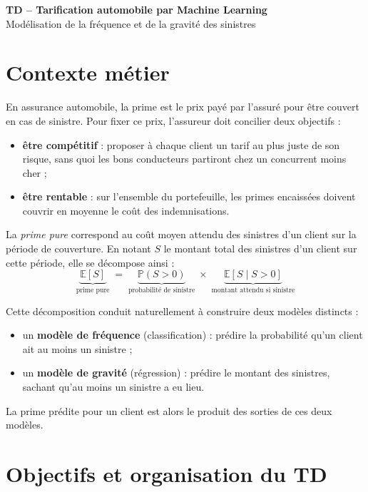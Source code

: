 \documentclass[a4paper,11pt]{article}
\begin{document}
	
	\begin{center}
		{\LARGE\bfseries TD -- Tarification automobile par Machine Learning}\\[6pt]
		{\large Modélisation de la fréquence et de la gravité des sinistres}
	\end{center}
	
	\section*{Contexte métier}
	
	En assurance automobile, la prime est le prix payé par l'assuré pour être couvert en cas de sinistre. Pour fixer ce prix, l'assureur doit concilier deux objectifs :
	\begin{itemize}
		\item \textbf{être compétitif} : proposer à chaque client un tarif au plus juste de son risque, sans quoi les bons conducteurs partiront chez un concurrent moins cher ;
		\item \textbf{être rentable} : sur l'ensemble du portefeuille, les primes encaissées doivent couvrir en moyenne le coût des indemnisations.
	\end{itemize}
	
	La \emph{prime pure} correspond au coût moyen attendu des sinistres d'un client sur la période de couverture. En notant $S$ le montant total des sinistres d'un client sur cette période, elle se décompose ainsi :
	\[
	\underbrace{\mathbb{E}[S]}_{\text{prime pure}}
	\;=\;
	\underbrace{\mathbb{P}(S > 0)}_{\text{probabilité de sinistre}}
	\;\times\;
	\underbrace{\mathbb{E}[S \mid S > 0]}_{\text{montant attendu si sinistre}}
	\]
	
	Cette décomposition conduit naturellement à construire deux modèles distincts :
	\begin{itemize}
		\item un \textbf{modèle de fréquence} (classification) : prédire la probabilité qu'un client ait au moins un sinistre ;
		\item un \textbf{modèle de gravité} (régression) : prédire le montant des sinistres, sachant qu'au moins un sinistre a eu lieu.
	\end{itemize}
	La prime prédite pour un client est alors le produit des sorties de ces deux modèles.
	
	\section*{Objectifs et organisation du TD}
	
\end{document}
